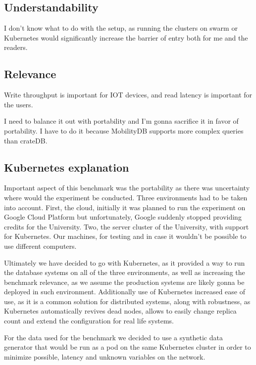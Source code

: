 \subsection{Understandability}
I don't know what to do with the setup, as running the clusters on swarm or Kubernetes would significantly increase the barrier of entry both for me and the readers.

\subsection{Relevance}
Write throughput is important for IOT devices, and read latency is important for the users.

I need to balance it out with portability and I'm gonna sacrifice it in favor of portability.
I have to do it because MobilityDB supports more complex queries than crateDB.








\subsection{Kubernetes explanation}

Important aspect of this benchmark was the portability as there was uncertainty where would the experiment be conducted.
Three environments had to be taken into account.
First, the cloud, initially it was planned to run the experiment on Google Cloud Platform but unfortunately, Google suddenly stopped providing credits for the University.
Two, the server cluster of the University, with support for Kubernetes.
Our machines, for testing and in case it wouldn't be possible to use different computers.

Ultimately we have decided to go with Kubernetes, as it provided a way to run the database systems on all of the three environments, as well as increasing the benchmark relevance, as we assume the production systems are likely gonna be deployed in such environment.
Additionally use of Kubernetes increased ease of use, as it is a common solution for distributed systems, along with robustness, as Kubernetes automatically revives dead nodes, allows to easily change replica count and extend the configuration for real life systems.

For the data used for the benchmark we decided to use a synthetic data generator that would be run as a pod on the same Kubernetes cluster in order to minimize possible, latency and unknown variables on the network.
